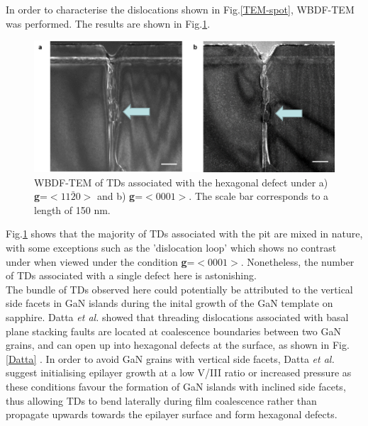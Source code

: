 In order to characterise the dislocations shown in Fig.\ref{TEM-spot}, WBDF-TEM was performed. The results are shown in Fig.\ref{WBDF-spot}.
\begin{figure}[h]
	\centering
	\includegraphics[width=1\textwidth]{Figs/Ch3/WBDF-yall}
	\caption[h] {WBDF-TEM of TDs associated with the hexagonal defect under a) \textbf{g}=$<11\bar{2}0>$ and b) \textbf{g}=$<0001>$. The scale bar corresponds to a length of 150 nm.}
	\label{WBDF-spot}
\end{figure}
\FloatBarrier 

Fig.\ref{WBDF-spot} shows that the majority of TDs associated with the pit are mixed in nature, with some exceptions such as the 'dislocation loop' which shows no contrast under when viewed under the condition \textbf{g}=$<0001>$. Nonetheless, the number of TDs associated with a single defect here is astonishing.\\
The bundle of TDs observed here could potentially be attributed to the vertical side facets in GaN islands during the inital growth of the GaN template on sapphire. Datta \textit{et al.} showed that threading dislocations associated with basal plane stacking faults are located at coalescence boundaries between two GaN grains, and can open up into hexagonal defects at the surface, as shown in Fig.\ref{Datta} \cite{Datta2004}. In order to avoid GaN grains with vertical side facets, Datta \textit{et al.} suggest initialising epilayer growth at a low V/III ratio or increased pressure as these conditions favour the formation of GaN islands with inclined side facets\cite{Hiramatsu2001,Beaumont1999}, thus allowing TDs to bend laterally during film coalescence rather than propagate upwards towards the epilayer surface and form hexagonal defects.

